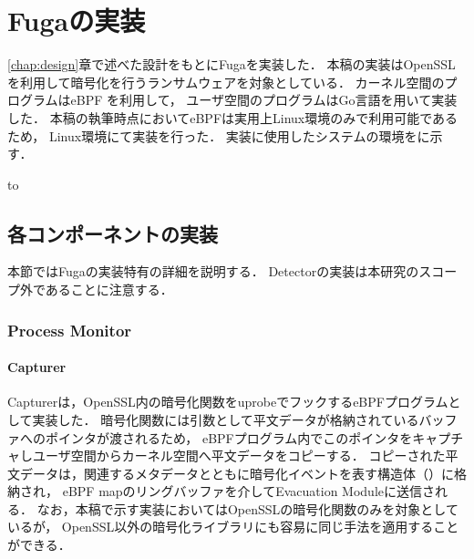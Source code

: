 \chapter{Fugaの実装}
\label{chap:implementation}
\ref{chap:design}章で述べた設計をもとにFugaを実装した．
本稿の実装はOpenSSLを利用して暗号化を行うランサムウェアを対象としている．
カーネル空間のプログラムはeBPF \cite{WhatiseB81:online} を利用して，
ユーザ空間のプログラムはGo言語を用いて実装した．
本稿の執筆時点においてeBPFは実用上Linux環境のみで利用可能であるため，
Linux環境にて実装を行った．
実装に使用したシステムの環境をに示す．
\begin{table}[t]
  \caption{Implementation environment for the proposed method.}
  \label{tab:impl-env}
  \hbox to
\end{table}

\section{各コンポーネントの実装}
本節ではFugaの実装特有の詳細を説明する．
Detectorの実装は本研究のスコープ外であることに注意する．

\subsection{Process Monitor}
\subsubsection{Capturer}
Capturerは，OpenSSL内の暗号化関数をuprobeでフックするeBPFプログラムとして実装した．
暗号化関数には引数として平文データが格納されているバッファへのポインタが渡されるため，
eBPFプログラム内でこのポインタをキャプチャしユーザ空間からカーネル空間へ平文データをコピーする．
コピーされた平文データは，関連するメタデータとともに暗号化イベントを表す構造体（）に格納され，
eBPF mapのリングバッファを介してEvacuation Moduleに送信される．
なお，本稿で示す実装においてはOpenSSLの暗号化関数のみを対象としているが，
OpenSSL以外の暗号化ライブラリにも容易に同じ手法を適用することができる．

